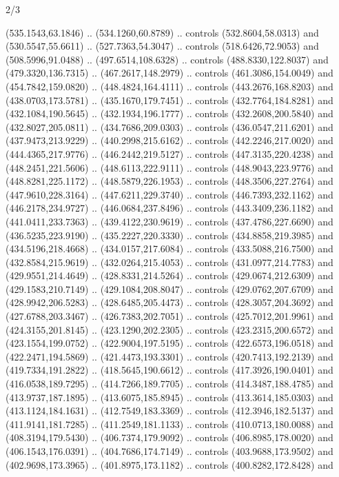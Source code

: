 \begin{flagdescription}{2/3}
\begin{scope}[xshift=0.5\flaglength,yshift=0.5\flagwidth,scale=\flagwidth/562]
\begin{scope}[y=1pt, x=1pt, yscale=-1,shift={(-421.88,-281.25)}]
  (535.1543,63.1846) .. (534.1260,60.8789) .. controls (532.8604,58.0313) and
  (530.5547,55.6611) .. (527.7363,54.3047) .. controls (518.6426,72.9053) and
  (508.5996,91.0488) .. (497.6514,108.6328) .. controls (488.8330,122.8037) and
  (479.3320,136.7315) .. (467.2617,148.2979) .. controls (461.3086,154.0049) and
  (454.7842,159.0820) .. (448.4824,164.4111) .. controls (443.2676,168.8203) and
  (438.0703,173.5781) .. (435.1670,179.7451) .. controls (432.7764,184.8281) and
  (432.1084,190.5645) .. (432.1934,196.1777) .. controls (432.2608,200.5840) and
  (432.8027,205.0811) .. (434.7686,209.0303) .. controls (436.0547,211.6201) and
  (437.9473,213.9229) .. (440.2998,215.6162) .. controls (442.2246,217.0020) and
  (444.4365,217.9776) .. (446.2442,219.5127) .. controls (447.3135,220.4238) and
  (448.2451,221.5606) .. (448.6113,222.9111) .. controls (448.9043,223.9776) and
  (448.8281,225.1172) .. (448.5879,226.1953) .. controls (448.3506,227.2764) and
  (447.9610,228.3164) .. (447.6211,229.3740) .. controls (446.7393,232.1162) and
  (446.2178,234.9727) .. (446.0684,237.8496) .. controls (443.3409,236.1182) and
  (441.0411,233.7363) .. (439.4122,230.9619) .. controls (437.4786,227.6690) and
  (436.5235,223.9190) .. (435.2227,220.3330) .. controls (434.8858,219.3985) and
  (434.5196,218.4668) .. (434.0157,217.6084) .. controls (433.5088,216.7500) and
  (432.8584,215.9619) .. (432.0264,215.4053) .. controls (431.0977,214.7783) and
  (429.9551,214.4649) .. (428.8331,214.5264) .. controls (429.0674,212.6309) and
  (429.1583,210.7149) .. (429.1084,208.8047) .. controls (429.0762,207.6709) and
  (428.9942,206.5283) .. (428.6485,205.4473) .. controls (428.3057,204.3692) and
  (427.6788,203.3467) .. (426.7383,202.7051) .. controls (425.7012,201.9961) and
  (424.3155,201.8145) .. (423.1290,202.2305) .. controls (423.2315,200.6572) and
  (423.1554,199.0752) .. (422.9004,197.5195) .. controls (422.6573,196.0518) and
  (422.2471,194.5869) .. (421.4473,193.3301) .. controls (420.7413,192.2139) and
  (419.7334,191.2822) .. (418.5645,190.6612) .. controls (417.3926,190.0401) and
  (416.0538,189.7295) .. (414.7266,189.7705) .. controls (414.3487,188.4785) and
  (413.9737,187.1895) .. (413.6075,185.8945) .. controls (413.3614,185.0303) and
  (413.1124,184.1631) .. (412.7549,183.3369) .. controls (412.3946,182.5137) and
  (411.9141,181.7285) .. (411.2549,181.1133) .. controls (410.0713,180.0088) and
  (408.3194,179.5430) .. (406.7374,179.9092) .. controls (406.8985,178.0020) and
  (406.1543,176.0391) .. (404.7686,174.7149) .. controls (403.9688,173.9502) and
  (402.9698,173.3965) .. (401.8975,173.1182) .. controls (400.8282,172.8428) and

\end{scope}
\end{scope}
\end{flagdescription}
